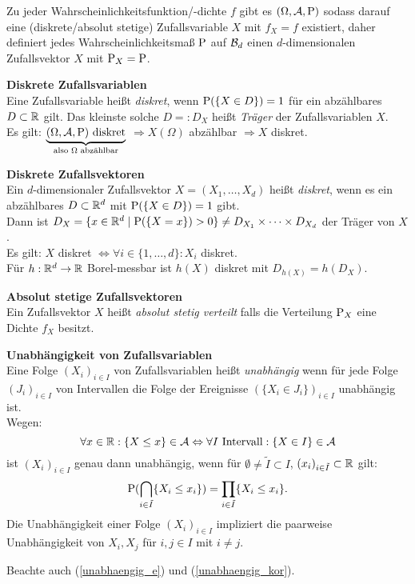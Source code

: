 Zu jeder Wahrscheinlichkeitsfunktion/-dichte $f$ gibt es $(\Omega,\A,\P)$ sodass
darauf eine (diskrete/absolut stetige) Zufallsvariable $X$ mit $f_X=f$ existiert,
daher definiert jedes Wahrscheinlichkeitsmaß $\P$ auf $\B{d}$ einen
$d$-dimensionalen Zufallsvektor $X$ mit $\P_X=\P$.

\textbf{Diskrete Zufallsvariablen}\\
Eine Zufallsvariable heißt \textit{diskret}, wenn $\P(\{X\in D\})=1$
für ein abzählbares $D\subset\R$ gilt.
Das kleinste solche $D=:D_X$ heißt \textit{Träger} der Zufallsvariablen $X$.\\
Es gilt: 
$\underbrace{(\Omega,\A,\P) \text{ diskret}}_{\text{also $\Omega$ abzählbar}}$
$\Rightarrow X(\Omega)$ abzählbar $\Rightarrow X$ diskret.

\textbf{Diskrete Zufallsvektoren}\\
Ein $d$-dimensionaler Zufallsvektor $X=(X_1,\ldots,X_d)$ heißt \textit{diskret},
wenn es ein abzählbares $D\subset\R^d$ mit $\P(\{X\in D\})=1$ gibt.\\
Dann ist $D_X=\{x\in\R^d\mid \P(\{X=x\})>0\}\neq D_{X_1}\times\cdots\times D_{X_d}$
der Träger von $X$.\\
Es gilt: $X$ diskret $\Leftrightarrow\forall i\in\{1,\ldots,d\}: X_i$ diskret.\\
Für $h:\R^d\to\R$ Borel-messbar ist $h(X)$ diskret mit $D_{h(X)}=h(D_X)$.

\textbf{Absolut stetige Zufallsvektoren}\\
Ein Zufallsvektor $X$ heißt \textit{absolut stetig verteilt} falls die Verteilung
$\P_X$ eine Dichte $f_X$ besitzt.

\textbf{Unabhängigkeit von Zufallsvariablen}\\
Eine Folge $(X_i)_{i\in I}$ von Zufallsvariablen heißt \textit{unabhängig} wenn für
jede Folge $(J_i)_{i\in I}$ von Intervallen die Folge der Ereignisse
$(\{X_i\in J_i\})_{i\in I}$ unabhängig ist.\\
Wegen:
\[
	\forall x\in\R:\{X\leq x\}\in\A
	\Leftrightarrow\forall I \text{ Intervall}:\{X\in I\}\in\A
\]
ist $(X_i)_{i\in I}$ genau dann unabhängig, wenn für 
$\emptyset\neq\tilde{I}\subset I$, $(x_i)_{i\in\tilde{I}}\subset\R$ gilt:
\[
	\P(\bigcap_{i\in\tilde{I}}\{X_i\leq x_i\})=\prod_{i\in\tilde{I}}\{X_i\leq x_i\}.
\]
Die Unabhängigkeit einer Folge $(X_i)_{i\in I}$ impliziert die paarweise
Unabhängigkeit von $X_i,X_j$ für $i,j\in I$ mit $i\neq j$.

Beachte auch (\ref{unabhaengig_e}) und (\ref{unabhaengig_kor}).

